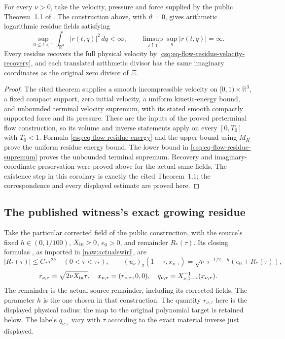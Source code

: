 \begin{cqproposition}
For every $\nu>0$, take the velocity, pressure and force supplied by
the public Theorem~1.1 of \cite{openaiNS2026release}. The construction above,
with $\vartheta=0$, gives arithmetic logarithmic residue fields
satisfying
\[
 \sup_{0\leq t<1}\int_{\mathbb R^3}|r(t,q)|^2\,dq<\infty,
 \qquad
 \limsup_{t\uparrow1}\sup_q|r(t,q)|=\infty .
\]
Every residue recovers the full physical velocity by
\eqref{csq:eq-flow-residue-velocity-recovery}, and each translated
arithmetic divisor has the same imaginary coordinates as the
original zero divisor of $\Xi$.
\end{cqproposition}
\begin{proof}
The cited theorem supplies a smooth incompressible velocity on
$[0,1)\times\mathbb R^3$, a fixed compact support, zero initial
velocity, a uniform kinetic-energy bound, and unbounded terminal
velocity supremum, with its stated smooth compactly supported force
and its pressure. These are the inputs of the proved preterminal
flow construction, so its volume and inverse statements apply
on every $[0,T_0]$ with $T_0<1$. Formula
\eqref{csq:eq-flow-residue-energy} and the upper bound using $M_K$
prove the uniform residue energy bound. The lower bound in
\eqref{csq:eq-flow-residue-supremum} proves the unbounded terminal
supremum. Recovery and imaginary-coordinate preservation were
proved above for the actual same fields. The existence step in
this corollary is exactly the cited Theorem~1.1; the correspondence
and every displayed estimate are proved here.
\end{proof}

\subsection{The published witness's exact growing residue}

Take the particular corrected field of the public construction, with
the source's fixed $h\in(0,1/100)$, $X_{\rm in}>0$, $e_0>0$,
and remainder $R_*(\tau)$. Its closing formulas
\cite[equations (10.20)--(10.22), p.~124]{openaiNS2026release}, as imported in \eqref{naw:actualswirl}, are
\[
 |R_*(\tau)|\leq C_*\tau^{2h}\quad(0<\tau<\tau_*),\qquad
 (u_\nu)_2(1-\tau,x_{\nu,\tau})
   =\sqrt\nu\,\tau^{-1/2-h}(e_0+R_*(\tau)),
\]
\[
 r_{\nu,\tau}=\sqrt{2\nu X_{\rm in}\tau},\quad
 x_{\nu,\tau}=(r_{\nu,\tau},0,0),\quad
 q_{\nu,\tau}=X_{\nu,1-\tau}^{-1}(x_{\nu,\tau}).
\]
The remainder is the actual source remainder, including its corrected
fields. The parameter $h$ is the one chosen in that construction.
The quantity $r_{\nu,\tau}$ here is the displayed physical radius;
the map to the original polynomial target is retained below.
The labels $q_{\nu,\tau}$ vary with $\tau$ according to the exact
material inverse just displayed.

